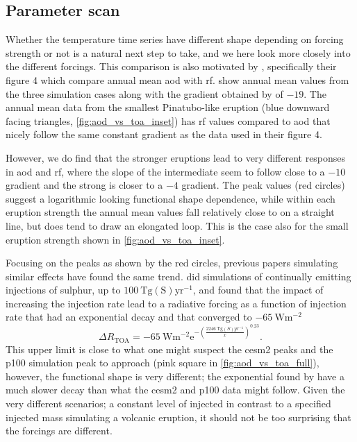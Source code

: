 \documentclass{ametsocV5}
\newcommand{\iso}[1][i]{{#1}njected \ce{SO2}}
\begin{document}
\subsection{Parameter scan}

Whether the temperature time series have different shape depending on forcing strength
or not is a natural next step to take, and we here look more closely into the different
forcings. This comparison is also motivated by \citet{gregory2016}, specifically their
figure 4 which compare annual mean \acrfull{aod} with \acrfull{rf}.
 show annual mean values from the three simulation cases along
with the gradient obtained by \citet{gregory2016} of \(-19\). The annual mean data from
the smallest Pinatubo-like eruption (blue downward facing triangles,
\cref{fig:aod_vs_toa_inset}) has \acrshort{rf} values compared to \acrshort{aod} that
nicely follow the same constant gradient as the \citet{gregory2016} data used in their
figure 4.

However, we do find that the stronger eruptions lead to very different responses in
\acrshort{aod} and \acrshort{rf}, where the slope of the intermediate seem to follow
close to a \( -10 \) gradient and the strong is closer to a \( -4 \) gradient. The peak
values (red circles) suggest a logarithmic looking functional shape dependence, while
within each eruption strength the annual mean values fall relatively close to on a
straight line, but does tend to draw an elongated loop. This is the case also for the
small eruption strength shown in \cref{fig:aod_vs_toa_inset}.

Focusing on the peaks as shown by the red circles, previous papers simulating similar
effects have found the same trend. \citet{niemeier2015} did simulations of continually
emitting injections of sulphur, up to \( \SI{100}{\tera\gram
  \mathrm{(S)}\mathrm{yr}^{-1}} \), and found that the impact of increasing the injection
rate lead to a radiative forcing as a function of injection rate that had an exponential
decay and that converged to \( \SI{-65}{\watt\meter^{-2}} \)
\begin{equation}
  \Delta
  R_{\mathrm{TOA}} =
  -\SI{65}{\watt\metre^{-2}}
  \mathrm{e}^{-\left(\frac{\SI{2246}{\tera\gram(S)yr^{-1}}}{x}\right)^{0.23}}.
  \label{eq:niemeier_exponential}
\end{equation}
This upper limit is close to what one might suspect the \acrshort{cesm2} peaks and the
\acrfull{p100} simulation peak to approach (pink square in \cref{fig:aod_vs_toa_full}),
however, the functional shape is very different; the exponential found by
\citet{niemeier2015} have a much slower decay than what the \acrshort{cesm2} and
\acrshort{p100} data might follow. Given the very different scenarios; a constant level
of \iso{} in contrast to a specified injected mass simulating a volcanic eruption, it
should not be too surprising that the forcings are different.
\end{document}
